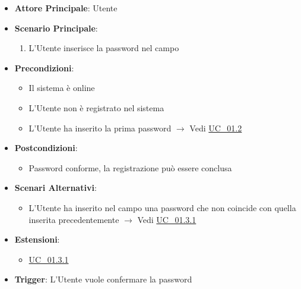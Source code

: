 \begin{itemize}
    \item \textbf{Attore Principale}: Utente
    \item \textbf{Scenario Principale}:
    \begin{enumerate}
        \item L'Utente inserisce la password nel campo 
    \end{enumerate}
    \item \textbf{Precondizioni}:
    \begin{itemize}
        \item Il sistema è online
        \item L'Utente non è registrato nel sistema
        \item L'Utente ha inserito la prima password $\rightarrow$ Vedi \hyperref[uc_01.2]{UC\_01.2}
    \end{itemize}
    \item \textbf{Postcondizioni}:
    \begin{itemize}
        \item Password conforme, la registrazione può essere conclusa
    \end{itemize}
    \item \textbf{Scenari Alternativi}:
    \begin{itemize}
        \item L'Utente ha inserito nel campo  una password che non coincide con quella inserita precedentemente $\rightarrow$ Vedi \hyperref[uc_01.3.1]{UC\_01.3.1}
    \end{itemize}
    \item \textbf{Estensioni}:
    \begin{itemize}
        \item \hyperref[uc_01.3.1]{UC\_01.3.1}
    \end{itemize}
    \item \textbf{Trigger}: L'Utente vuole confermare la password
\end{itemize}

\label{uc_01.3.1}

